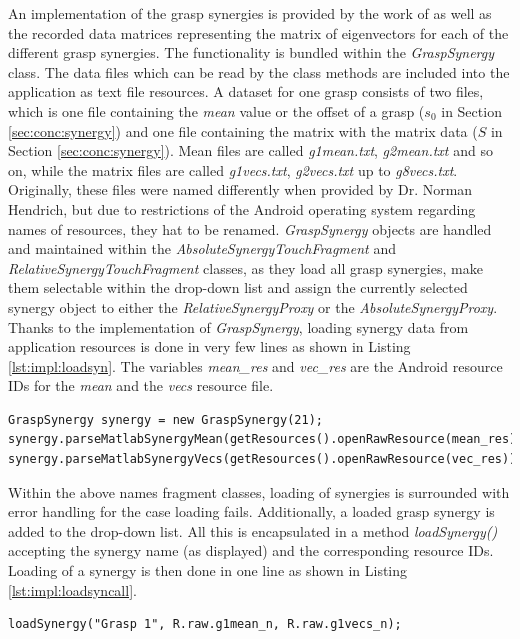 An implementation of the grasp synergies is provided by the work of \citeauthor{Bernardino2013} as well as the recorded data matrices representing the matrix of eigenvectors for each of the different grasp synergies. The functionality is bundled within the \textit{GraspSynergy} class. The data files which can be read by the class methods are included into the application as text file resources. A dataset for one grasp consists of two files, which is one file containing the \textit{mean} value or the offset of a grasp ($s_0$ in Section \ref{sec:conc:synergy}) and one file containing the matrix with the matrix data ($S$ in Section \ref{sec:conc:synergy}). Mean files are called \textit{g1mean.txt}, \textit{g2mean.txt} and so on, while the matrix files are called \textit{g1vecs.txt}, \textit{g2vecs.txt} up to \textit{g8vecs.txt}. Originally, these files were named differently when provided by Dr. Norman Hendrich, but due to restrictions of the Android operating system regarding names of resources, they hat to be renamed.
\textit{GraspSynergy} objects are handled and maintained within the \textit{AbsoluteSynergyTouchFragment} and \textit{RelativeSynergyTouchFragment} classes, as they load all grasp synergies, make them selectable within the drop-down list and assign the currently selected synergy object to either the \textit{RelativeSynergyProxy} or the \textit{AbsoluteSynergyProxy}. Thanks to the implementation of \textit{GraspSynergy}, loading synergy data from application resources is done in very few lines as shown in Listing \ref{lst:impl:loadsyn}. The variables \textit{mean\_res} and \textit{vec\_res} are the Android resource IDs for the \textit{mean} and the \textit{vecs} resource file.
\begin{lstlisting}[caption={Loading GraspSynergy data}, label=lst:impl:loadsyn]
GraspSynergy synergy = new GraspSynergy(21);
synergy.parseMatlabSynergyMean(getResources().openRawResource(mean_res));
synergy.parseMatlabSynergyVecs(getResources().openRawResource(vec_res));
\end{lstlisting}

Within the above names fragment classes, loading of synergies is surrounded with error handling for the case loading fails. Additionally, a loaded grasp synergy is added to the drop-down list. All this is encapsulated in a method \textit{loadSynergy()} accepting the synergy name (as displayed) and the corresponding resource IDs. Loading of a synergy is then done in one line as shown in Listing \ref{lst:impl:loadsyncall}.
\begin{lstlisting}[caption={Call to loadSynergy()}, label=lst:impl:loadsyncall]
loadSynergy("Grasp 1", R.raw.g1mean_n, R.raw.g1vecs_n);
\end{lstlisting}


